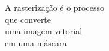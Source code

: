 \documentclass[preview]{standalone}
\begin{document}
A rasterização é o processo\\ que converte\\uma imagem vetorial\\em uma máscara\\
\end{document}

